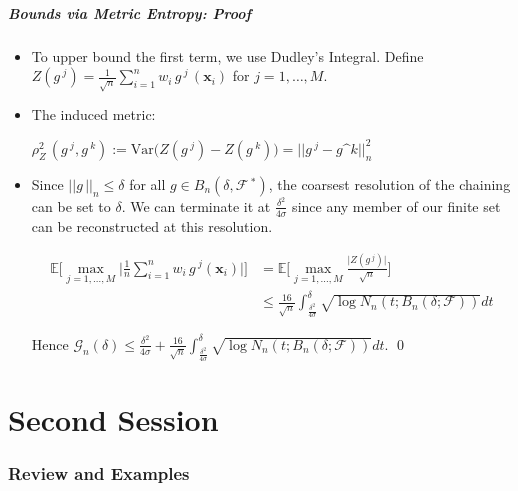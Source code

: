 \documentclass[11pt]{beamer}
\newcommand{\E}{\mathbb{E}}
\newcommand{\bx}{\mathbf{x}}
\newcommand{\cF}{\mathcal{F}}
\newcommand{\cG}{\mathcal{G}}
\begin{document}
	\begin{frame}
		\frametitle{Bounds via Metric Entropy: Proof}
		\begin{itemize}	
		\item
		To upper bound the first term, we use Dudley's Integral. Define $Z(g\,^j) = \frac{1}{\sqrt{n}}\sum_{i = 1}^{n}w_i\, g\,^j\,(\bx_i)$ for $j = 1, \dots, M$. 
		\item The induced metric: 
		\begin{small}
			$\rho_Z^2\,(g\,^j, g\,^k) := \mathrm{Var}\big(Z(g\,^j) - Z(g\,^k)\big) = ||g\,^j - g\^k||_n^2$
		\end{small}

		\item
		Since $||g\,||_n \leq \delta$ for all $g \in B_n(\delta, \cF\,^*)$, the coarsest resolution of the chaining can be set to $\delta$. We can terminate it at $\frac{\delta^2}{4\sigma}$ since any member of our finite set can be reconstructed  at this resolution. 
		\begin{small}
		\begin{align*}
			\E\Bigg[\max_{j = 1, \dots, M} \Big|\frac{1}{n}\sum_{i = 1}^{n} w_i\, g\,^j(\bx_i) \Big|\Bigg] &= \E\Bigg[\max_{j = 1, \dots, M} \frac{\Big|Z(g\,^j)\Big|}{\sqrt{n}}\Bigg]\\
			&\leq \frac{16}{\sqrt{n}} \int_{\frac{\delta^2}{4\sigma}}^{\delta} \sqrt{\log N_n(t; B_n(\delta; \cF))} dt
		\end{align*}
		\end{small}

		Hence $\cG_n(\delta) \leq \frac{\delta^2}{4\sigma} + \frac{16}{\sqrt{n}} \int_{\frac{\delta^2}{4\sigma}}^{\delta} \sqrt{\log N_n(t; B_n(\delta; \cF))} dt$. \qed
		\end{itemize}
	\end{frame}


	\part{Second Session}
	\frame{\partpage}
	
	\section{Review and Examples}
	\frame{\sectionpage}
	
\end{document}
